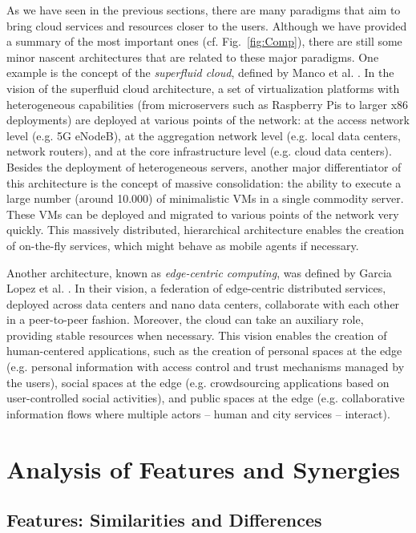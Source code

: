 \documentclass[twocolumn,preprint,3p]{elsarticle}
\begin{document}
As we have seen in the previous sections, there are many paradigms that aim to bring cloud services and resources closer to the users. Although we have provided a summary of the most important ones (cf. Fig.~\ref{fig:Comp}), there are still some minor nascent architectures that are related to these major paradigms. One example is the concept of the \textit{superfluid cloud}, defined by Manco et al. \cite{Manco2015}. In the vision of the superfluid cloud architecture, a set of virtualization platforms with heterogeneous capabilities (from microservers such as Raspberry Pis to larger x86 deployments) are deployed at various points of the network: at the access network level (e.g. 5G eNodeB), at the aggregation network level (e.g. local data centers, network routers), and at the core infrastructure level (e.g. cloud data centers). Besides the deployment of heterogeneous servers, another major differentiator of this architecture is the concept of massive consolidation: the ability to execute a large number (around 10.000) of minimalistic VMs in a single commodity server. These VMs can be deployed and migrated to various points of the network very quickly. This massively distributed, hierarchical architecture enables the creation of on-the-fly services, which might behave as mobile agents if necessary.

Another architecture, known as \textit{edge-centric computing}, was defined by Garcia Lopez et al. \cite{GarciaLopez15}. In their vision, a federation of edge-centric distributed services, deployed across data centers and nano data centers, collaborate with each other in a peer-to-peer fashion. Moreover, the cloud can take an auxiliary role, providing stable resources when necessary. This vision enables the creation of human-centered applications, such as the creation of personal spaces at the edge (e.g. personal information with access control and trust mechanisms managed by the users), social spaces at the edge (e.g. crowdsourcing applications based on user-controlled social activities), and public spaces at the edge (e.g. collaborative information flows where multiple actors -- human and city services -- interact).





\section{Analysis of Features and Synergies}
\label{feat_syn}

\subsection{Features: Similarities and Differences}
\label{feat_syn::feat}
\end{document}
